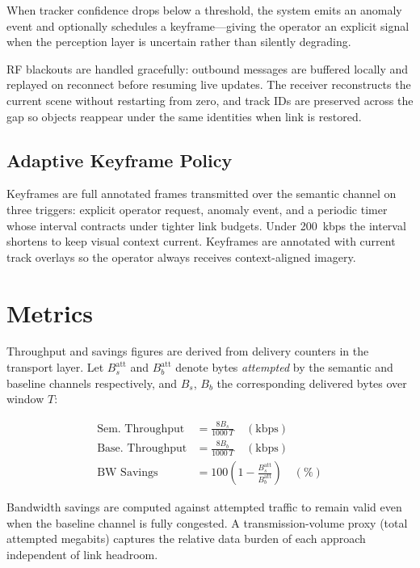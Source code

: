 \documentclass[11pt]{article}
\begin{document}
When tracker confidence drops below a threshold, the system emits an
anomaly event and optionally schedules a keyframe---giving the operator
an explicit signal when the perception layer is uncertain rather than
silently degrading.

RF blackouts are handled gracefully: outbound messages are buffered
locally and replayed on reconnect before resuming live updates. The
receiver reconstructs the current scene without restarting from zero,
and track IDs are preserved across the gap so objects reappear under
the same identities when link is restored.

\subsection{Adaptive Keyframe Policy}

Keyframes are full annotated frames transmitted over the semantic
channel on three triggers: explicit operator request, anomaly event,
and a periodic timer whose interval contracts under tighter link
budgets. Under 200~kbps the interval shortens to keep visual context
current. Keyframes are annotated with current track overlays so the
operator always receives context-aligned imagery.

\section{Metrics}

Throughput and savings figures are derived from delivery counters in
the transport layer. Let $B_s^{\text{att}}$ and $B_b^{\text{att}}$
denote bytes \emph{attempted} by the semantic and baseline channels
respectively, and $B_s$, $B_b$ the corresponding delivered bytes over
window $T$:

\begin{align}
\text{Sem.\ Throughput} &= \frac{8 B_s}{1000\,T} \quad (\text{kbps}) \\
\text{Base.\ Throughput} &= \frac{8 B_b}{1000\,T} \quad (\text{kbps}) \\
\text{BW Savings} &= 100\!\left(1 - \frac{B_s^{\text{att}}}{B_b^{\text{att}}}\right) \quad (\%)
\end{align}

Bandwidth savings are computed against attempted traffic to remain
valid even when the baseline channel is fully congested. A
transmission-volume proxy (total attempted megabits) captures the
relative data burden of each approach independent of link headroom.
\end{document}
